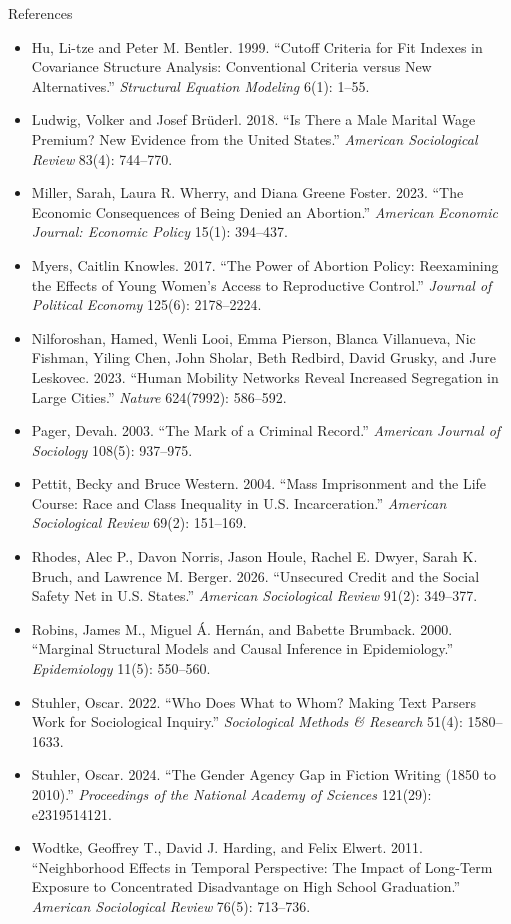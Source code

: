 \documentclass[aspectratio=169,11pt,xcolor=dvipsnames]{beamer}
\begin{document}
\begin{frame}[allowframebreaks,t]{References}
\begin{itemize}
\item Hu, Li-tze and Peter M. Bentler. 1999. ``Cutoff Criteria for Fit Indexes in Covariance Structure Analysis: Conventional Criteria versus New Alternatives.'' \textit{Structural Equation Modeling} 6(1): 1--55.
\item Ludwig, Volker and Josef Br\"uderl. 2018. ``Is There a Male Marital Wage Premium? New Evidence from the United States.'' \textit{American Sociological Review} 83(4): 744--770.
\item Miller, Sarah, Laura R. Wherry, and Diana Greene Foster. 2023. ``The Economic Consequences of Being Denied an Abortion.'' \textit{American Economic Journal: Economic Policy} 15(1): 394--437.
\item Myers, Caitlin Knowles. 2017. ``The Power of Abortion Policy: Reexamining the Effects of Young Women's Access to Reproductive Control.'' \textit{Journal of Political Economy} 125(6): 2178--2224.
\item Nilforoshan, Hamed, Wenli Looi, Emma Pierson, Blanca Villanueva, Nic Fishman, Yiling Chen, John Sholar, Beth Redbird, David Grusky, and Jure Leskovec. 2023. ``Human Mobility Networks Reveal Increased Segregation in Large Cities.'' \textit{Nature} 624(7992): 586--592.
\item Pager, Devah. 2003. ``The Mark of a Criminal Record.'' \textit{American Journal of Sociology} 108(5): 937--975.
\item Pettit, Becky and Bruce Western. 2004. ``Mass Imprisonment and the Life Course: Race and Class Inequality in U.S. Incarceration.'' \textit{American Sociological Review} 69(2): 151--169.
\item Rhodes, Alec P., Davon Norris, Jason Houle, Rachel E. Dwyer, Sarah K. Bruch, and Lawrence M. Berger. 2026. ``Unsecured Credit and the Social Safety Net in U.S. States.'' \textit{American Sociological Review} 91(2): 349--377.
\item Robins, James M., Miguel \'A. Hern\'an, and Babette Brumback. 2000. ``Marginal Structural Models and Causal Inference in Epidemiology.'' \textit{Epidemiology} 11(5): 550--560.
\item Stuhler, Oscar. 2022. ``Who Does What to Whom? Making Text Parsers Work for Sociological Inquiry.'' \textit{Sociological Methods \& Research} 51(4): 1580--1633.
\item Stuhler, Oscar. 2024. ``The Gender Agency Gap in Fiction Writing (1850 to 2010).'' \textit{Proceedings of the National Academy of Sciences} 121(29): e2319514121.
\item Wodtke, Geoffrey T., David J. Harding, and Felix Elwert. 2011. ``Neighborhood Effects in Temporal Perspective: The Impact of Long-Term Exposure to Concentrated Disadvantage on High School Graduation.'' \textit{American Sociological Review} 76(5): 713--736.
\end{itemize}
\end{frame}
\end{document}
